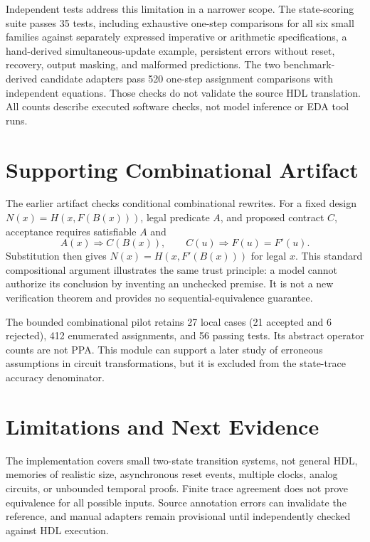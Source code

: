 \documentclass[conference,10pt]{IEEEtran}
\begin{document}
Independent tests address this limitation in a narrower scope. The state-scoring suite passes 35 tests, including exhaustive one-step comparisons for all six small families against separately expressed imperative or arithmetic specifications, a hand-derived simultaneous-update example, persistent errors without reset, recovery, output masking, and malformed predictions. The two benchmark-derived candidate adapters pass 520 one-step assignment comparisons with independent equations. Those checks do not validate the source HDL translation. All counts describe executed software checks, not model inference or EDA tool runs.

\section{Supporting Combinational Artifact}
The earlier artifact checks conditional combinational rewrites. For a fixed design $N(x)=H(x,F(B(x)))$, legal predicate $A$, and proposed contract $C$, acceptance requires satisfiable $A$ and
\begin{equation*}
A(x)\Rightarrow C(B(x)),\qquad C(u)\Rightarrow F(u)=F'(u).
\end{equation*}
Substitution then gives $N(x)=H(x,F'(B(x)))$ for legal $x$. This standard compositional argument illustrates the same trust principle: a model cannot authorize its conclusion by inventing an unchecked premise. It is not a new verification theorem and provides no sequential-equivalence guarantee.

The bounded combinational pilot retains 27 local cases (21 accepted and 6 rejected), 412 enumerated assignments, and 56 passing tests. Its abstract operator counts are not PPA. This module can support a later study of erroneous assumptions in circuit transformations, but it is excluded from the state-trace accuracy denominator.

\section{Limitations and Next Evidence}
The implementation covers small two-state transition systems, not general HDL, memories of realistic size, asynchronous reset events, multiple clocks, analog circuits, or unbounded temporal proofs. Finite trace agreement does not prove equivalence for all possible inputs. Source annotation errors can invalidate the reference, and manual adapters remain provisional until independently checked against HDL execution.
\end{document}

